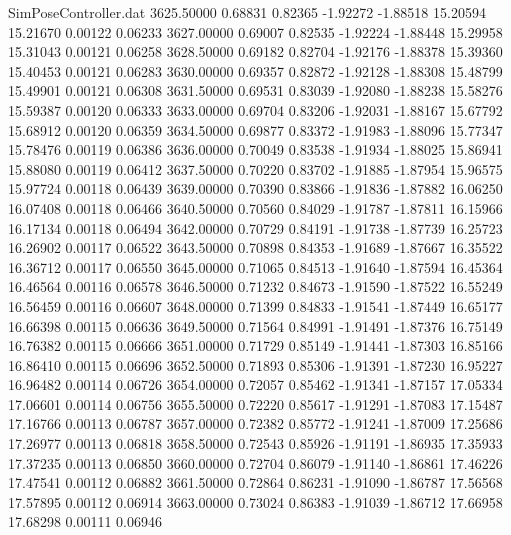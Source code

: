 \begin{filecontents}{SimPoseController.dat}
3625.50000    0.68831    0.82365    -1.92272   -1.88518   15.20594   15.21670    0.00122    0.06233
3627.00000    0.69007    0.82535    -1.92224   -1.88448   15.29958   15.31043    0.00121    0.06258
3628.50000    0.69182    0.82704    -1.92176   -1.88378   15.39360   15.40453    0.00121    0.06283
3630.00000    0.69357    0.82872    -1.92128   -1.88308   15.48799   15.49901    0.00121    0.06308
3631.50000    0.69531    0.83039    -1.92080   -1.88238   15.58276   15.59387    0.00120    0.06333
3633.00000    0.69704    0.83206    -1.92031   -1.88167   15.67792   15.68912    0.00120    0.06359
3634.50000    0.69877    0.83372    -1.91983   -1.88096   15.77347   15.78476    0.00119    0.06386
3636.00000    0.70049    0.83538    -1.91934   -1.88025   15.86941   15.88080    0.00119    0.06412
3637.50000    0.70220    0.83702    -1.91885   -1.87954   15.96575   15.97724    0.00118    0.06439
3639.00000    0.70390    0.83866    -1.91836   -1.87882   16.06250   16.07408    0.00118    0.06466
3640.50000    0.70560    0.84029    -1.91787   -1.87811   16.15966   16.17134    0.00118    0.06494
3642.00000    0.70729    0.84191    -1.91738   -1.87739   16.25723   16.26902    0.00117    0.06522
3643.50000    0.70898    0.84353    -1.91689   -1.87667   16.35522   16.36712    0.00117    0.06550
3645.00000    0.71065    0.84513    -1.91640   -1.87594   16.45364   16.46564    0.00116    0.06578
3646.50000    0.71232    0.84673    -1.91590   -1.87522   16.55249   16.56459    0.00116    0.06607
3648.00000    0.71399    0.84833    -1.91541   -1.87449   16.65177   16.66398    0.00115    0.06636
3649.50000    0.71564    0.84991    -1.91491   -1.87376   16.75149   16.76382    0.00115    0.06666
3651.00000    0.71729    0.85149    -1.91441   -1.87303   16.85166   16.86410    0.00115    0.06696
3652.50000    0.71893    0.85306    -1.91391   -1.87230   16.95227   16.96482    0.00114    0.06726
3654.00000    0.72057    0.85462    -1.91341   -1.87157   17.05334   17.06601    0.00114    0.06756
3655.50000    0.72220    0.85617    -1.91291   -1.87083   17.15487   17.16766    0.00113    0.06787
3657.00000    0.72382    0.85772    -1.91241   -1.87009   17.25686   17.26977    0.00113    0.06818
3658.50000    0.72543    0.85926    -1.91191   -1.86935   17.35933   17.37235    0.00113    0.06850
3660.00000    0.72704    0.86079    -1.91140   -1.86861   17.46226   17.47541    0.00112    0.06882
3661.50000    0.72864    0.86231    -1.91090   -1.86787   17.56568   17.57895    0.00112    0.06914
3663.00000    0.73024    0.86383    -1.91039   -1.86712   17.66958   17.68298    0.00111    0.06946

\end{filecontents}
